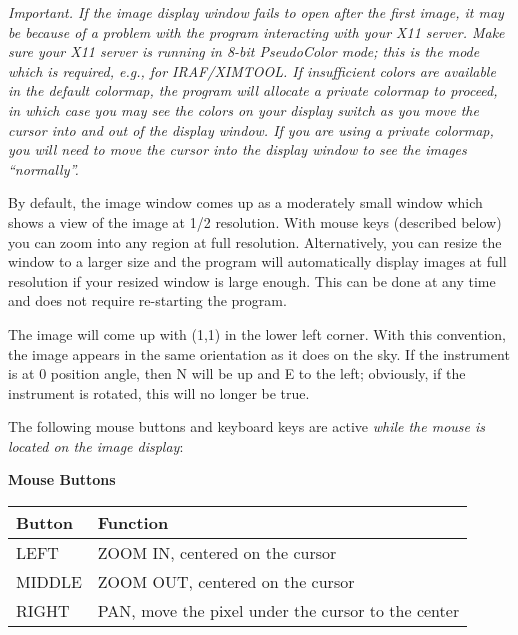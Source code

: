 \documentclass[10pt]{article}
\renewcommand{\[}{\begin{eqnarray}}
\renewcommand{\]}{\end{eqnarray}}
\begin{document}
\textit{Important. If the image display window fails to open after the
first image, it may be  because of a problem with the program interacting
with your X11 server. Make sure your X11 server is running in 8-bit 
PseudoColor mode; this is the mode which is required, e.g., for IRAF/XIMTOOL.
If insufficient colors are available in the default colormap, the program
will allocate a private colormap to proceed, in which case you may see
the colors on your display switch as you move the cursor into and out of
the display window. If you are using a private colormap, you will need to
move the cursor into the display window to see the images ``normally''. }

By default, the image window comes up as a moderately small window which
shows a view of the image at 1/2 resolution. With mouse keys (described
below) you can zoom into any region at full resolution. Alternatively,
you can resize the window to a larger size and the program will automatically
display images at full resolution if your resized window is large enough.
This can be done at any time and does not require re-starting the program.

The image will come up with (1,1) in the lower left corner. With this
convention, the image appears in the same orientation as it does on the
sky. If the instrument is at 0 position angle, then N will be up and E to
the left; obviously, if the instrument is rotated, this will no longer be
true.

The following mouse buttons and keyboard keys are active \textit{while the mouse
is located on the image display}:

\begin{center}
{\bf Mouse Buttons}\\
\begin{tabular}{ll}
\hline
Button & Function\\
\hline
LEFT  &ZOOM IN, centered on the cursor\\
MIDDLE&ZOOM OUT, centered on the cursor\\
RIGHT &PAN, move the pixel under the cursor to the center\\
\hline
\end{tabular}
\end{center}
\end{document}
